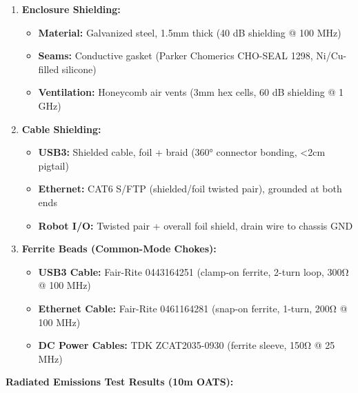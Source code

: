 \documentclass[
]{article}
\providecommand{\tightlist}{%
  \setlength{\itemsep}{0pt}\setlength{\parskip}{0pt}}
\begin{document}
\begin{enumerate}
\def\labelenumi{\arabic{enumi}.}
\tightlist
\item
  \textbf{Enclosure Shielding:}

  \begin{itemize}
  \tightlist
  \item
    \textbf{Material:} Galvanized steel, 1.5mm thick (40 dB shielding @
    100 MHz)
  \item
    \textbf{Seams:} Conductive gasket (Parker Chomerics CHO-SEAL 1298,
    Ni/Cu-filled silicone)
  \item
    \textbf{Ventilation:} Honeycomb air vents (3mm hex cells, 60 dB
    shielding @ 1 GHz)
  \end{itemize}
\item
  \textbf{Cable Shielding:}

  \begin{itemize}
  \tightlist
  \item
    \textbf{USB3:} Shielded cable, foil + braid (360° connector bonding,
    \textless2cm pigtail)
  \item
    \textbf{Ethernet:} CAT6 S/FTP (shielded/foil twisted pair), grounded
    at both ends
  \item
    \textbf{Robot I/O:} Twisted pair + overall foil shield, drain wire
    to chassis GND
  \end{itemize}
\item
  \textbf{Ferrite Beads (Common-Mode Chokes):}

  \begin{itemize}
  \tightlist
  \item
    \textbf{USB3 Cable:} Fair-Rite 0443164251 (clamp-on ferrite, 2-turn
    loop, 300Ω @ 100 MHz)
  \item
    \textbf{Ethernet Cable:} Fair-Rite 0461164281 (snap-on ferrite,
    1-turn, 200Ω @ 100 MHz)
  \item
    \textbf{DC Power Cables:} TDK ZCAT2035-0930 (ferrite sleeve, 150Ω @
    25 MHz)
  \end{itemize}
\end{enumerate}

\textbf{Radiated Emissions Test Results (10m OATS):}
\end{document}
